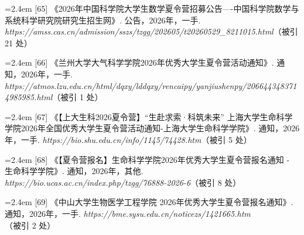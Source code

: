 {\vspace{0.6pt}
\vspace{3.5pt}\par
\nopagebreak\vspace{1pt}
\noindent\hangindent=2.4em \label{src:S0074}{\color{cAccent}[65]} 《2026年中国科学院大学生数学夏令营招募公告----中国科学院数学与系统科学研究院研究生招生网》. 公告，2026年，一手. \textit{https://amss.cas.cn/admission/sszs/tzgg/202605/t20260529\_8211015.html}（被引 21 处）\par
\vspace{0.6pt}
\vspace{3.5pt}\par
\nopagebreak\vspace{1pt}
\noindent\hangindent=2.4em \label{src:S0075}{\color{cAccent}[66]} 《兰州大学大气科学学院2026年优秀大学生夏令营活动通知》. 通知，2026年，一手. \textit{https://atmos.lzu.edu.cn/html/dqxy/lddqxy/rencaipy/yanjiushenpy/2066443483714985985.html}（被引 1 处）\par
\vspace{0.6pt}
\vspace{3.5pt}\par
\nopagebreak\vspace{1pt}
\noindent\hangindent=2.4em \label{src:S0076}{\color{cAccent}[67]} 《【上大生科2026夏令营】“生赴求索·科筑未来” 上海大学生命科学学院2026年全国优秀大学生夏令营活动通知-上海大学生命科学学院》. 通知，2026年，一手. \textit{https://bio.shu.edu.cn/info/1145/74428.htm}（被引 5 处）\par
\vspace{0.6pt}
\vspace{3.5pt}\par
\nopagebreak\vspace{1pt}
\noindent\hangindent=2.4em \label{src:S0077}{\color{cAccent}[68]} 《【夏令营报名】生命科学学院2026年优秀大学生夏令营报名通知 - 生命科学学院》. 通知，2026年，其他. \textit{https://bio.ucas.ac.cn/index.php/tzgg/76888-2026-6}（被引 8 处）\par
\vspace{0.6pt}
\vspace{3.5pt}\par
\nopagebreak\vspace{1pt}
\noindent\hangindent=2.4em \label{src:S0078}{\color{cAccent}[69]} 《中山大学生物医学工程学院 2026年优秀大学生夏令营报名通知》. 通知，2026年，一手. \textit{https://bme.sysu.edu.cn/noticezs/1421665.htm}（被引 2 处）\par
}
